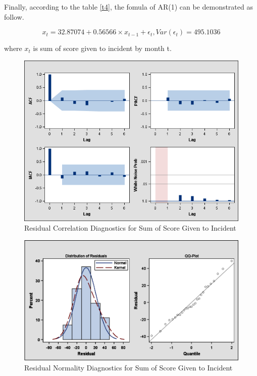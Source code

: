 Finally, according to the table \ref{t4}, the fomula of AR(1) can be demonstrated as follow.

\begin{equation}
x_{t} = 32.87074 + 0.56566\times x_{t-1} + \epsilon_{t}, Var(\epsilon_{t}) = 495.1036
\label{e1}
\end{equation}

where $x_{t}$ is sum of score given to incident by month t.

\begin{figure}[H]
\centering
\includegraphics[scale=0.5]{Pic/Q1/3.png}
\caption{Residual Correlation Diagnostics for Sum of Score Given to Incident}
\label{f3}
\end{figure}

\begin{figure}[H]
\centering
\includegraphics[scale=0.25]{Pic/Q1/4.png}
\caption{Residual Normality Diagnostics for Sum of Score Given to Incident}
\label{f4}
\end{figure}

